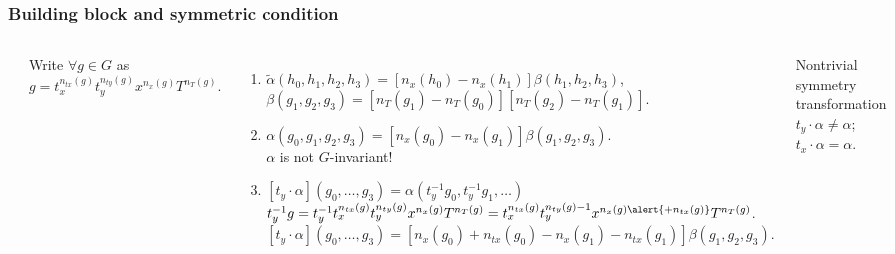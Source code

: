 \documentclass[xcolor=table, 10pt, aspectratio=43]{beamer}
\begin{document}
\begin{frame}
	\frametitle{Building block and symmetric condition}
	\begin{columns}
		\begin{center}
		\end{center}
		Write $\forall g\in G$ as $g = t_x^{n_{tx}(g)}t_y^{n_{ty}(g)}
	  x^{n_x(g)}T^{n_T(g)}.$
		\begin{enumerate}
			\item $\tilde \alpha(h_0,h_1,h_2,h_3) = [n_x(h_0)-n_x(h_1)]\beta(h_1,h_2,h_3)$,
			$\beta(g_1,g_2,g_3)=[n_T(g_1)-n_T(g_0)][n_T(g_2)-n_T(g_1)]$.
			\item $\alpha(g_0,g_1,g_2,g_3)=[n_x(g_0)-n_x(g_1)]\beta(g_1,g_2,g_3)$.\\
			\alert{$\alpha$ is not $G$-invariant!}
			\item $[t_y\cdot\alpha](g_0,\ldots,g_3)=\alpha(t_y^{-1}g_0,t_y^{-1}g_1,\ldots)$\\
			$t_y^{-1}g = t_y^{-1} t_x^{n_{tx}(g)}t_y^{n_{ty}(g)}
		  x^{n_x(g)}T^{n_T(g)}
			=t_x^{n_{tx}(g)}t_y^{n_{ty}(g)-1}
		  x^{n_x(g)\alert{+n_{tx}(g)}}T^{n_T(g)}$.
			$[t_y\cdot\alpha](g_0,\ldots,g_3)=[n_x(g_0)+n_{tx}(g_0)-n_x(g_1)-n_{tx}(g_1)]\beta(g_1,g_2,g_3).$
		\end{enumerate}
		\begin{block}{Nontrivial symmetry transformation}
			$t_y\cdot\alpha\neq\alpha$; $t_x\cdot\alpha=\alpha$.
		\end{block}
	\end{columns}
\end{frame}
\end{document}
